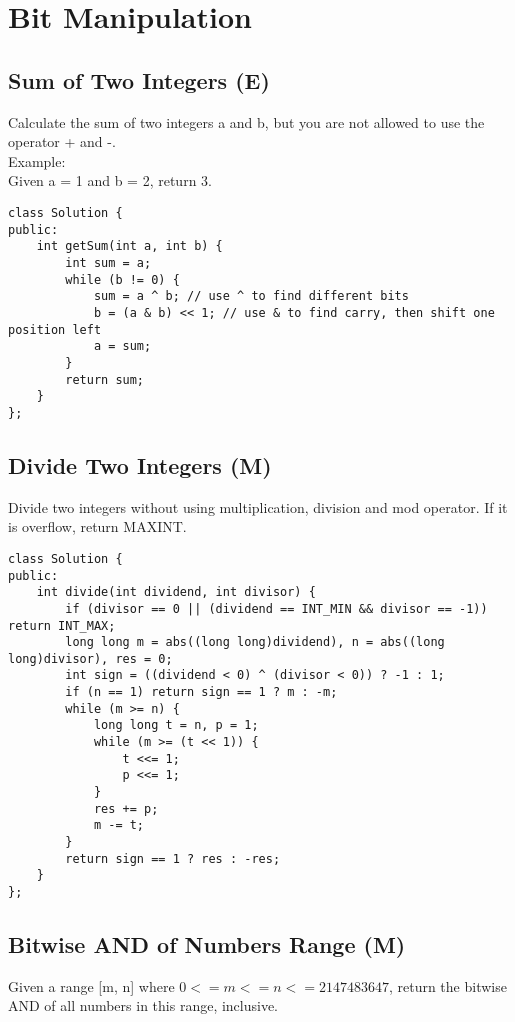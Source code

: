 \chapter{Bit Manipulation}


\section{Sum of Two Integers (E)}
Calculate the sum of two integers a and b, but you are not allowed to use the operator + and -. \\

Example:\\
Given a = 1 and b = 2, return 3. \\

\begin{lstlisting}
class Solution {
public:
    int getSum(int a, int b) {
        int sum = a;
        while (b != 0) {
            sum = a ^ b; // use ^ to find different bits
            b = (a & b) << 1; // use & to find carry, then shift one position left
            a = sum;
        }
        return sum;
    }
};
\end{lstlisting}


\section{Divide Two Integers (M)}
Divide two integers without using multiplication, division and mod operator. If it is overflow, return MAXINT. \\

\begin{lstlisting}
class Solution {
public:
    int divide(int dividend, int divisor) {
        if (divisor == 0 || (dividend == INT_MIN && divisor == -1)) return INT_MAX;
        long long m = abs((long long)dividend), n = abs((long long)divisor), res = 0;
        int sign = ((dividend < 0) ^ (divisor < 0)) ? -1 : 1;
        if (n == 1) return sign == 1 ? m : -m;
        while (m >= n) {
            long long t = n, p = 1;
            while (m >= (t << 1)) {
                t <<= 1;
                p <<= 1;
            }
            res += p;
            m -= t;
        }
        return sign == 1 ? res : -res;
    }
};
\end{lstlisting}


\section{Bitwise AND of Numbers Range (M)}
Given a range [m, n] where $0 <= m <= n <= 2147483647$, return the bitwise AND of all numbers in this range, inclusive.\\

